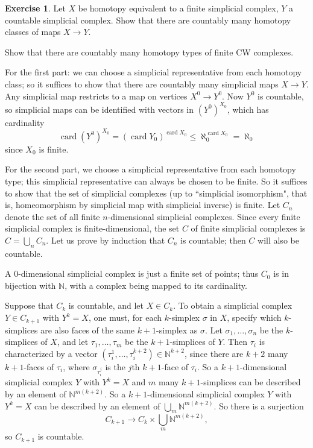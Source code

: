 \documentclass[10pt]{article}
\newcommand{\NN}{\mathbb{N}}
\newcommand{\card}{\operatorname{card}}
\theoremstyle{definition}
\newtheorem{exer}{Exercise}
\begin{document}
\begin{exer}
Let $X$ be homotopy equivalent to a finite simplicial complex, $Y$ a countable simplicial complex.
Show that there are countably many homotopy classes of maps $X \to Y$.

Show that there are countably many homotopy types of finite CW complexes.
\end{exer}

For the first part: we can choose a simplicial representative from each homotopy class; so it suffices to show that there are countably many simplicial maps $X \to Y$.
Any simplicial map restricts to a map on vertices $X^0 \to Y^0$. Now $Y^0$ is countable, so simplicial maps can be identified with vectors in $(Y^0)^{X_0}$, which has cardinality
$$\card (Y^0)^{X_0} = (\card Y_0)^{\card X_0} \leq \aleph_0^{\card X_0} = \aleph_0$$
since $X_0$ is finite.

For the second part, we choose a simplicial representative from each homotopy type; this simplicial representative can always be chosen to be finite.
So it suffices to show that the set of simplicial complexes (up to ``simplicial isomorphism", that is, homeomorphism by simplicial map with simplicial inverse) is finite. Let $C_n$ denote the set of all finite $n$-dimensional simplicial complexes.
Since every finite simplicial complex is finite-dimensional, the set $C$ of finite simplicial complexes is $C = \bigcup_n C_n$.
Let us prove by induction that $C_n$ is countable; then $C$ will also be countable.

A $0$-dimensional simplicial complex is just a finite set of points; thus $C_0$ is in bijection with $\NN$, with a complex being mapped to its cardinality.

Suppose that $C_k$ is countable, and let $X \in C_k$. To obtain a simplicial complex $Y \in C_{k+1}$ with $Y^k = X$, one must, for each $k$-simplex $\sigma$ in $X$, specify which $k$-simplices are also faces of the same $k+1$-simplex as $\sigma$.
Let $\sigma_1, \dots, \sigma_n$ be the $k$-simplices of $X$, and let $\tau_1, \dots, \tau_m$ be the $k+1$-simplices of $Y$.
Then $\tau_i$ is characterized by a vector $(\tau_i^1, \dots, \tau_i^{k+2}) \in \NN^{k+2}$, since there are $k+2$ many $k+1$-faces of $\tau_i$, where $\sigma_{\tau_i^j}$ is the $j$th $k+1$-face of $\tau_i$.
So a $k+1$-dimensional simplicial complex $Y$ with $Y^k = X$ and $m$ many $k+1$-simplices can be described by an element of $\NN^{m(k+2)}$.
So a $k+1$-dimensional simplicial complex $Y$ with $Y^k = X$ can be described by an element of $\bigcup_m \NN^{m(k+2)}$.
So there is a surjection
$$C_{k+1} \to C_k \times \bigcup_m \NN^{m(k+2)},$$
so $C_{k+1}$ is countable.
\end{document}
